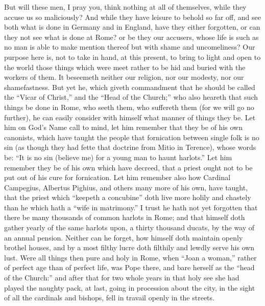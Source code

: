 
But will these men, I pray you, think nothing at all of themselves,
while they accuse us so maliciously? And while they have leisure
to behold so far off, and see both what is done in Germany and in England,
have they either forgotten, or can they not see what is done at Rome?
or be they our accusers,
whose life is such as no man is able to make mention thereof but with
shame and uncomeliness? Our purpose here is, not to take in hand,
at this present, to bring to light and open to the world those things
which were meet rather to be hid and buried with the workers of them.
It beseemeth neither our religion, nor our modesty, nor our shamefastness.
But yet he, which giveth commandment that he should be called the “Vicar
of Christ,” and the “Head of the Church;” who also
heareth that such things be done in Rome, who seeth them, who suffereth
them (for we will go no further), he can easily consider with himself
what manner of things they be. Let him on God’s Name call
to mind, let him remember that they be of his own canonists, which have
taught the people that fornication between single folk is no sin (as
though they had fette that doctrine from Mitio in Terence), whose words
be: “It is no sin (believe me) for a young man to haunt harlots.”
Let him remember they be of his own which have decreed, that a priest
ought not to be put out of his cure for fornication. Let him remember
also how Cardinal Campegius, Albertus Pighius, and others many more
of his own, have taught, that the priest which “keepeth a concubine”
doth live more holily and chastely than he which hath a “wife
in matrimony.”
I trust he hath not yet forgotten that there be many thousands of common
harlots in Rome; and that himself doth gather yearly of the same harlots
upon, a thirty thousand ducats, by the way of an annual pension.
Neither can he forget, how himself doth maintain openly brothel houses,
and by a most filthy lucre doth filthily and lewdly serve his own lust.
Were all things then pure and holy in Rome, when “Joan a woman,”
rather of perfect age than of perfect life, was Pope there, and bare
herself as the “head of the Church:” and after that for
two whole years in that holy see she had played the naughty pack, at
last, going in procession about the city, in the sight of all the cardinals
and bishops, fell in travail openly in the streets.

